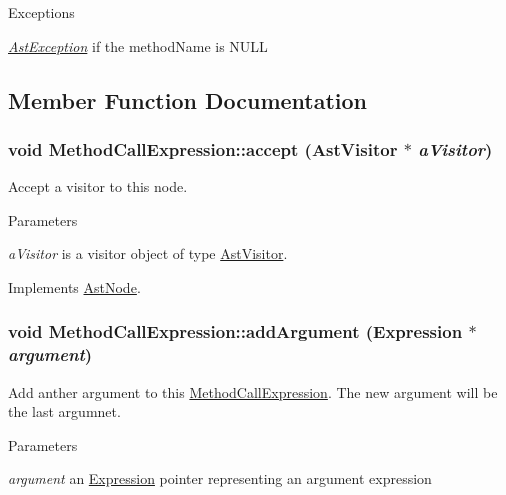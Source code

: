 \begin{DoxyExceptions}{Exceptions}
\item[{\em \hyperlink{classAstException}{AstException}}]if the methodName is NULL \end{DoxyExceptions}


\subsection{Member Function Documentation}
\hypertarget{classMethodCallExpression_a306fe23511d0d35c003a6256816ccea6}{
\subsubsection[{accept}]{\setlength{\rightskip}{0pt plus 5cm}void MethodCallExpression::accept ({\bf AstVisitor} $\ast$ {\em aVisitor})}}
\label{classMethodCallExpression_a306fe23511d0d35c003a6256816ccea6}
Accept a visitor to this node. 
\begin{DoxyParams}{Parameters}
\item[{\em aVisitor}]is a visitor object of type \hyperlink{classAstVisitor}{AstVisitor}. \end{DoxyParams}


Implements \hyperlink{classAstNode_a67b2d6ce1262da2954fb4db255759fb3}{AstNode}.\hypertarget{classMethodCallExpression_a40f6c0c6861cc3ea50253a47a7ec6879}{
\subsubsection[{addArgument}]{\setlength{\rightskip}{0pt plus 5cm}void MethodCallExpression::addArgument ({\bf Expression} $\ast$ {\em argument})}}
\label{classMethodCallExpression_a40f6c0c6861cc3ea50253a47a7ec6879}
Add anther argument to this \hyperlink{classMethodCallExpression}{MethodCallExpression}. The new argument will be the last argumnet.


\begin{DoxyParams}{Parameters}
\item[{\em argument}]an \hyperlink{classExpression}{Expression} pointer representing an argument expression \end{DoxyParams}

